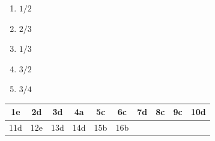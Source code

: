 \begin{enumerate}

\begin{enumerate}[label=\Alph*)]
\item $1/2$
\item $2/3$
\item $1/3$
\item $3/2$
\item $3/4$
\end{enumerate}

\end{enumerate}
\begin{center}
\begin{tabular}{|c|c|c|c|c|c|c|c|c|c|}
\hline
1e & 2d & 3d & 4a & 5c & 6c & 7d & 8c & 9c & 10d\\
\hline
11d & 12e & 13d & 14d & 15b & 16b & & & & \\
\hline
\end{tabular}
\end{center}


